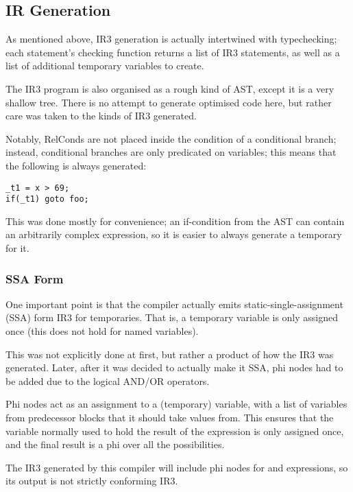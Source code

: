 \documentclass[12pt]{article}
\begin{document}
\subsection{IR Generation}

As mentioned above, IR3 generation is actually intertwined with typechecking; each statement's checking function returns
a list of IR3 statements, as well as a list of additional temporary variables to create.

The IR3 program is also organised as a rough kind of AST, except it is a very shallow tree. There is no attempt to generate
optimised code here, but rather care was taken to  the kinds of IR3 generated.

Notably, RelConds are not placed inside the condition of a conditional branch; instead, conditional branches are only
predicated on variables; this means that the following is always generated:

\begin{verbatim}
_t1 = x > 69;
if(_t1) goto foo;
\end{verbatim}

This was done mostly for convenience; an if-condition from the AST can contain an arbitrarily complex expression, so it is
easier to always generate a temporary for it.


\subsubsection{SSA Form}

One important point is that the compiler actually emits static-single-assignment (SSA) form IR3 for temporaries. That is,
a temporary variable is only assigned once (this does not hold for named variables).

This was not explicitly done at first, but rather a product of how the IR3 was generated. Later, after it was decided to
actually make it SSA, phi nodes had to be added due to the logical AND/OR operators.

Phi nodes act as an assignment to a (temporary) variable, with a list of variables from predecessor blocks that it should
take values from. This ensures that the variable normally used to hold the result of the expression is only assigned
once, and the final result is a phi over all the possibilities.

The IR3 generated by this compiler will include phi nodes for \eqtt{\&\&} and \eqtt{||} expressions, so its output
is not strictly conforming IR3.
\end{document}
